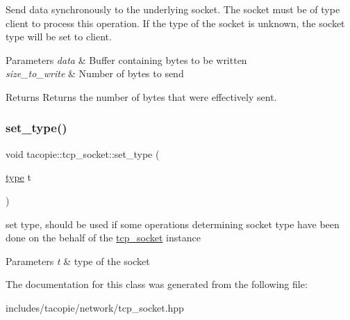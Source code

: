 Send data synchronously to the underlying socket. The socket must be of type client to process this operation. If the type of the socket is unknown, the socket type will be set to client.


\begin{DoxyParams}{Parameters}
{\em data} & Buffer containing bytes to be written \\
\hline
{\em size\+\_\+to\+\_\+write} & Number of bytes to send \\
\hline
\end{DoxyParams}
\begin{DoxyReturn}{Returns}
Returns the number of bytes that were effectively sent. 
\end{DoxyReturn}
\mbox{\label{classtacopie_1_1tcp__socket_a89be86ab254eec3fc16eedfba8b16fb2}} 
\subsubsection{\texorpdfstring{set\+\_\+type()}{set\_type()}}
{\footnotesize\ttfamily void tacopie\+::tcp\+\_\+socket\+::set\+\_\+type (\begin{DoxyParamCaption}\item[{\hyperlink{classtacopie_1_1tcp__socket_ad8376e85df96ab9523f5d079ed7172ab}{type}}]{t }\end{DoxyParamCaption})}

set type, should be used if some operations determining socket type have been done on the behalf of the \hyperlink{classtacopie_1_1tcp__socket}{tcp\+\_\+socket} instance


\begin{DoxyParams}{Parameters}
{\em t} & type of the socket \\
\hline
\end{DoxyParams}


The documentation for this class was generated from the following file\+:\begin{DoxyCompactItemize}
\item 
includes/tacopie/network/tcp\+\_\+socket.\+hpp\end{DoxyCompactItemize}
